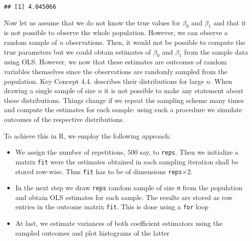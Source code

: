 \documentclass[]{book}
\providecommand{\tightlist}{%
  \setlength{\itemsep}{0pt}\setlength{\parskip}{0pt}}
\theoremstyle{definition}
\theoremstyle{definition}
\theoremstyle{definition}
\theoremstyle{remark}
\begin{document}
\begin{verbatim}
## [1] 4.045066
\end{verbatim}

Now let us assume that we do not know the true values for \(\beta_0\)
and \(\beta_1\) and that it is not possible to observe the whole
population. However, we can observe a random sample of \(n\)
observations. Then, it would not be possible to compute the true
parameters but we could obtain estimates of \(\beta_0\) and \(\beta_1\)
from the sample data using OLS. However, we now that these estimates are
outcomes of random variables themselves since the observations are
randomly sampled from the population. Key Concept 4.4. describes their
distributions for large \(n\). When drawing a single sample of size
\(n\) it is not possible to make any statement about these
distributions. Things change if we repeat the sampling scheme many times
and compute the estimates for each sample: using such a procedure we
simulate outcomes of the respective distributions.

To achieve this in R, we employ the following approach:

\begin{itemize}
\tightlist
\item
  We assign the number of repetitions, \(500\) say, to \texttt{reps}.
  Then we initialize a matrix \texttt{fit} were the estimates obtained
  in each sampling iteration shall be stored row-wise. Thus \texttt{fit}
  has to be of dimensions \texttt{reps}\(\times2\).
\item
  In the next step we draw \texttt{reps} random sample of size
  \texttt{n} from the population and obtain OLS estimates for each
  sample. The results are stored as row entries in the outcome matrix
  \texttt{fit}. This is done using a \texttt{for} loop
\item
  At last, we estimate variances of both coefficient estimators using
  the sampled outcomes and plot histograms of the latter
\end{itemize}
\end{document}
